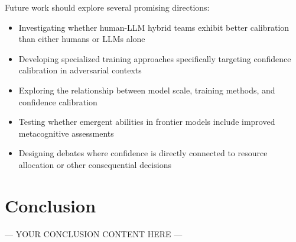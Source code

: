 \documentclass{article}
\begin{document}
Future work should explore several promising directions:
\begin{itemize}
    \item Investigating whether human-LLM hybrid teams exhibit better calibration than either humans or LLMs alone
    \item Developing specialized training approaches specifically targeting confidence calibration in adversarial contexts
    \item Exploring the relationship between model scale, training methods, and confidence calibration
    \item Testing whether emergent abilities in frontier models include improved metacognitive assessments
    \item Designing debates where confidence is directly connected to resource allocation or other consequential decisions
\end{itemize}

\section{Conclusion}

--- YOUR CONCLUSION CONTENT HERE ---


\end{document}
